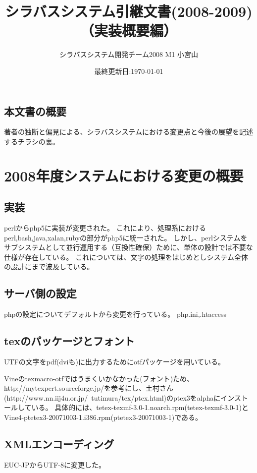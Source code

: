\documentclass[titlepage]{jsarticle}
\title{シラバスシステム引継文書(2008-2009)\\（実装概要編）}
\author{シラバスシステム開発チーム2008 M1 小宮山}
\date{最終更新日:\today}
\begin{document}
\maketitle
\subsection*{本文書の概要}
著者の独断と偏見による、シラバスシステムにおける変更点と今後の展望を記述するチラシの裏。
\section{2008年度システムにおける変更の概要}
\subsection{実装}
perlからphp5に実装が変更された。
これにより、処理系におけるperl,bash,java,xalan,rubyの部分がphp5に統一された。
しかし、perlシステムをサブシステムとして並行運用する（互換性確保）ために、単体の設計では不要な仕様が存在している。
これについては、文字の処理をはじめとしシステム全体の設計にまで波及している。
\subsection{サーバ側の設定}
phpの設定についてデフォルトから変更を行っている。
php.ini,.htaccess
\subsection{texのパッケージとフォント}
UTFの文字をpdf(dviも)に出力するためにotfパッケージを用いている。

Vineのtexmacro-otfではうまくいかなかった(フォント)ため、
http://mytexpert.sourceforge.jp/を参考にし、土村さん(http://www.nn.iij4u.or.jp/~tutimura/tex/ptex.html)のptex3をalphaにインストールしている。
具体的には、tetex-texmf-3.0-1.noarch.rpm(tetex-texmf-3.0-1)とVine4-ptetex3-20071003-1.i386.rpm(ptetex3-20071003-1)である。
\subsection{XMLエンコーディング}
EUC-JPからUTF-8に変更した。
\end{document}
